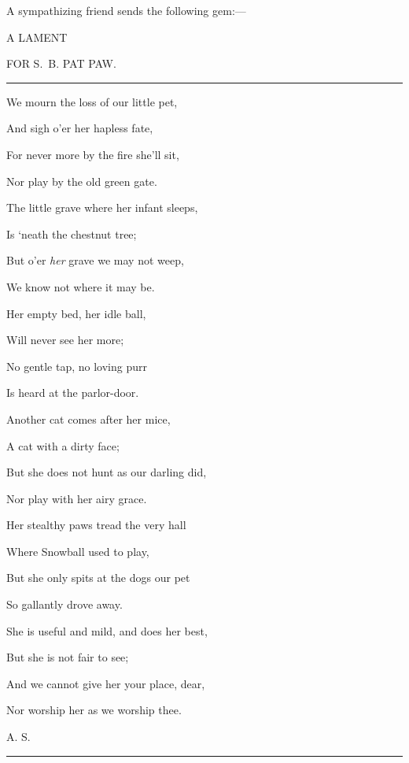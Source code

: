 A sympathizing friend sends the following gem:---

A LAMENT

FOR S.~B. PAT PAW.

\begin{center}\rule{0.5\linewidth}{0.5pt}\end{center}

We mourn the loss of our little pet,

And sigh o'er her hapless fate,

For never more by the fire she'll sit,

Nor play by the old green gate.

\hfill\break

The little grave where her infant sleeps,

Is `neath the chestnut tree;

But o'er \emph{her} grave we may not weep,

We know not where it may be.

\hfill\break

Her empty bed, her idle ball,

Will never see her more;

No gentle tap, no loving purr

Is heard at the parlor-door.

\hfill\break

Another cat comes after her mice,

A cat with a dirty face;

But she does not hunt as our darling did,

Nor play with her airy grace.

\hfill\break

Her stealthy paws tread the very hall

Where Snowball used to play,

But she only spits at the dogs our pet

So gallantly drove away.

\hfill\break

She is useful and mild, and does her best,

But she is not fair to see;

And we cannot give her your place, dear,

Nor worship her as we worship thee.

A. S.

\begin{center}\rule{0.5\linewidth}{0.5pt}\end{center}

